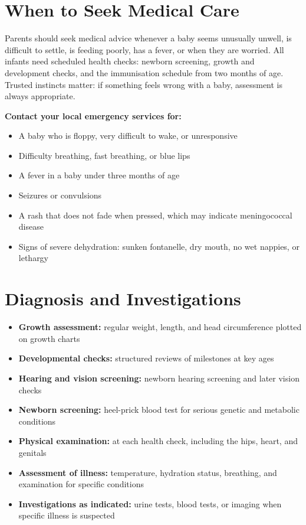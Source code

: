 \section*{When to Seek Medical Care}
Parents should seek medical advice whenever a baby seems unusually unwell, is difficult to settle, is feeding poorly, has a fever, or when they are worried. All infants need scheduled health checks: newborn screening, growth and development checks, and the immunisation schedule from two months of age. Trusted instincts matter: if something feels wrong with a baby, assessment is always appropriate.

\textbf{Contact your local emergency services for:}
\begin{itemize}
    \item A baby who is floppy, very difficult to wake, or unresponsive
    \item Difficulty breathing, fast breathing, or blue lips
    \item A fever in a baby under three months of age
    \item Seizures or convulsions
    \item A rash that does not fade when pressed, which may indicate meningococcal disease
    \item Signs of severe dehydration: sunken fontanelle, dry mouth, no wet nappies, or lethargy
\end{itemize}

\section*{Diagnosis and Investigations}
\begin{itemize}
    \item \textbf{Growth assessment:} regular weight, length, and head circumference plotted on growth charts
    \item \textbf{Developmental checks:} structured reviews of milestones at key ages
    \item \textbf{Hearing and vision screening:} newborn hearing screening and later vision checks
    \item \textbf{Newborn screening:} heel-prick blood test for serious genetic and metabolic conditions
    \item \textbf{Physical examination:} at each health check, including the hips, heart, and genitals
    \item \textbf{Assessment of illness:} temperature, hydration status, breathing, and examination for specific conditions
    \item \textbf{Investigations as indicated:} urine tests, blood tests, or imaging when specific illness is suspected
\end{itemize}

